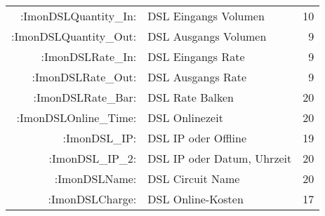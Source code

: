 \begin{description}
\begin{small}
\begin{center}
\begin{longtable}{rp{7cm}r}
   :ImonDSLQuantity\_In: &       DSL Eingangs Volumen        &  10 \\
  :ImonDSLQuantity\_Out: &       DSL Ausgangs Volumen        &   9 \\
       :ImonDSLRate\_In: &       DSL Eingangs Rate           &   9 \\
      :ImonDSLRate\_Out: &       DSL Ausgangs Rate           &   9 \\
      :ImonDSLRate\_Bar: &       DSL Rate Balken             &  20 \\
   :ImonDSLOnline\_Time: &       DSL Onlinezeit              &  20 \\
           :ImonDSL\_IP: &       DSL IP oder Offline         &  19 \\
        :ImonDSL\_IP\_2: &       DSL IP oder Datum, Uhrzeit  &  20 \\
           :ImonDSLName: &       DSL Circuit Name            &  20 \\
         :ImonDSLCharge: &       DSL Online-Kosten           &  17 \\
         

\end{longtable}
\end{center}
\end{small}
\end{description}

